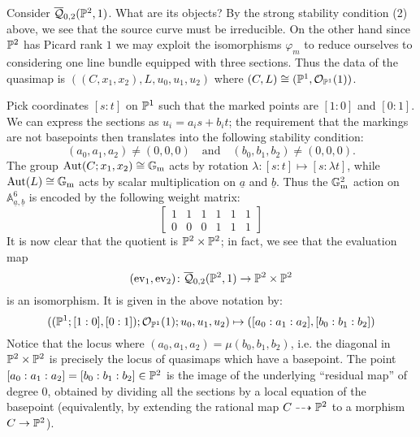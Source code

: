 \begin{example} Consider $\overline{\mathcal Q}_{0,2}(\mathbb P^2,1)$. What are its objects? By the strong stability condition (2) above, we see that the source curve must be irreducible. On the other hand since $\mathbb P^2$ has Picard rank $1$ we may exploit the isomorphisms $\varphi_m$ to reduce ourselves to considering one line bundle equipped with three sections. Thus the data of the quasimap is $((C,x_1,x_2),L,u_0,u_1,u_2)$ where $(C,L)\cong(\mathbb P^1,\mathcal{O}_{\mathbb P^1}(1))$.

Pick coordinates $[s:t]$ on $\mathbb P^1$ such that the marked points are $[1:0]$ and $[0:1]$. We can express the sections as $u_i=a_is+b_it$; the requirement that the markings are not basepoints then translates into the following stability condition:
 \[
  (a_0,a_1,a_2)\neq(0,0,0)\quad \text{and}\quad (b_0,b_1,b_2)\neq(0,0,0).
 \]
The group $\operatorname{Aut}(C;x_1,x_2)\cong\mathbb{G}_{\text{m}}$ acts by rotation $\lambda\colon[s:t]\mapsto[s:\lambda t]$, while $\operatorname{Aut}(L)\cong\mathbb{G}_{\text{m}}$ acts by scalar multiplication on $\underline{a}$ and $\underline{b}$. Thus the $\mathbb{G}_{\text{m}}^2$ action on $\mathbb A^6_{\underline{a} ,\underline{b}}$ is encoded by the following weight matrix:
\[ \left[ \begin{array}{cccccc}
1 & 1 & 1 & 1 & 1 & 1 \\
0 & 0 & 0 & 1 & 1 & 1 \end{array} \right]\] 
It is now clear that the quotient is $\mathbb P^2\times\mathbb P^2$; in fact, we see that the evaluation map
\[
 (\operatorname{ev}_1,\operatorname{ev}_2)\colon\overline{\mathcal Q}_{0,2}(\mathbb P^2,1)\rightarrow\mathbb P^2\times\mathbb P^2
\]
is an isomorphism. It is given in the above notation by:
\begin{equation*} ((\mathbb P^1;[1:0],[0:1]); \mathcal{O}_{\mathbb P^1}(1); u_0, u_1, u_2) \mapsto ([a_0 : a_1 : a_2],[b_0 : b_1 : b_2]) \end{equation*}
Notice that the locus where $(a_0,a_1,a_2)=\mu(b_0,b_1,b_2)$, i.e. the diagonal in $\mathbb P^2 \times \mathbb P^2$ is precisely the locus of quasimaps which have a basepoint. The point $[a_0:a_1:a_2]=[b_0:b_1:b_2]\in\mathbb P^2$ is the image of the underlying ``residual map'' of degree 0, obtained by dividing all the sections by a local equation of the basepoint (equivalently, by extending the rational map $C\dashrightarrow \mathbb P^2$ to a morphism $C \rightarrow \mathbb P^2$).


\end{example}
